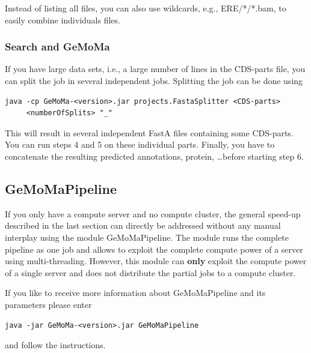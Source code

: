 \documentclass{article}
\begin{document}
Instead of listing all files, you can also use wildcards, e.g., ERE/*/*.bam, to easily combine individuals files.

\subsubsection{Search and GeMoMa}
If you have large data sets, i.e., a large number of lines in the CDS-parts file, you can split the job in several independent jobs. Splitting the job can be done using
\begin{verbatim}
java -cp GeMoMa-<version>.jar projects.FastaSplitter <CDS-parts> 
     <numberOfSplits> "_"
\end{verbatim}

This will result in several independent FastA files containing some CDS-parts. You can run steps 4 and 5 on these individual parts.
Finally, you have to concatenate the resulting predicted annotations, protein, \ldots before starting step 6.

\subsection{GeMoMaPipeline}
If you only have a compute server and no compute cluster, the general speed-up described in the last section can directly be addressed without any manual interplay using the module GeMoMaPipeline. The module runs the complete pipeline as one job and allows to exploit the complete compute power of a server using multi-threading. 
However, this module can \textbf{only} exploit the compute power of a single server and does not distribute the partial jobs to a compute cluster.

If you like to receive more information about GeMoMaPipeline and its parameters please enter
\begin{verbatim}
java -jar GeMoMa-<version>.jar GeMoMaPipeline
\end{verbatim}
and follow the instructions.
\end{document}
